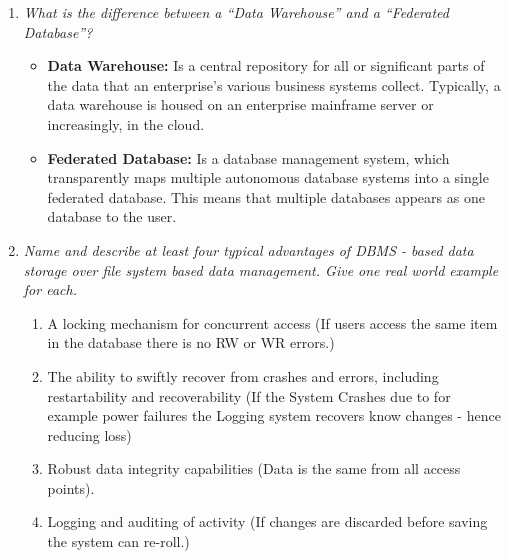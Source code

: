\documentclass[a4paper,10pt,titlepage]{article}
\begin{document}
\begin{enumerate}
\item
\textit{What is the difference between a “Data Warehouse” and a “Federated Database”?}\\

\begin{itemize}
\item
\textbf{Data Warehouse:} Is a central repository for all or significant parts of the data that an enterprise's various business systems collect. Typically, a data warehouse is housed on an enterprise mainframe server or increasingly, in the cloud. 
\item
\textbf{Federated Database:} Is a database management system, which transparently maps multiple autonomous database systems into a single federated database. This means that multiple databases appears as one database to the user.
\end{itemize}

\item
\textit{Name and describe at least four typical advantages of DBMS - based data storage over file system based data management. Give one real world example for each.}\\

\begin{enumerate}
\item
A locking mechanism for concurrent access (If users access the same item in the database there is no RW or WR errors.)
\item
The ability to swiftly recover from crashes and errors, including restartability and recoverability (If the System Crashes due to for example power failures the Logging system recovers know changes - hence reducing loss)
\item
Robust data integrity capabilities (Data is the same from all access points).
\item
Logging and auditing of activity (If changes are discarded before saving the system can re-roll.)
\end{enumerate}


\end{enumerate}
\end{document}
